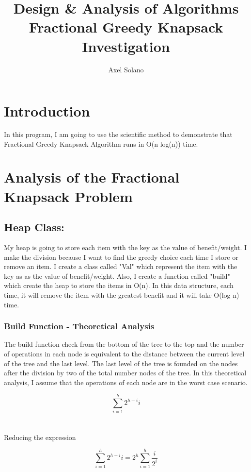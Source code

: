 \documentclass[14pt, oneside]{article}
\title{ \textbf{Design \& Analysis of Algorithms} \\
Fractional Greedy Knapsack Investigation}
\author{ Axel Solano}
\begin{document}
\maketitle
{}
\tableofcontents
\newpage


 \section{Introduction}

In this program, I am going to use the scientific method to demonstrate that Fractional Greedy Knapsack Algorithm runs in O(n log(n)) time.


\section{Analysis of the Fractional Knapsack Problem}

\subsection{Heap Class:}
My heap is going to store each item with the key as the value of benefit/weight. I make the division because I want to find the greedy choice each time I store or remove an item. I create a class called "Val" which represent the item with the key as as the value of benefit/weight. Also, I create a function called "build" which create the heap to store the items in O(n). In this data structure, each time, it will remove the item with the greatest benefit and it will take O(log n) time.

\subsubsection{Build Function - Theoretical Analysis}

The build function check from the bottom of the tree to the top and the number of operations in each node is equivalent to the distance between the current level of the tree and the last level. The last level of the tree is founded on the nodes after the division by two of the total number nodes of the tree. In this theoretical analysis, I assume that the operations of each node are in the worst case scenario.

$$\sum_{i=1}^{h} 2^{h-i} i$$\\
\\
Reducing the expression

$$\sum_{i=1}^{h} 2^{h-i} i = 2^{h} \sum_{i=1}^{h} \frac{i}{2^{i}} $$
\end{document}
